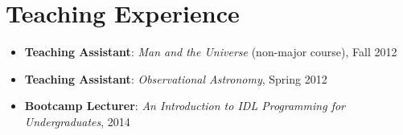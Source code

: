 \documentclass[11pt,letterpaper,roman]{moderncv}        %
\begin{document}
\begin{itemize}
\end{itemize}

\section{Teaching Experience}
\begin{itemize}
\setlength\itemsep{0.0em}
\item {\bfseries Teaching Assistant}: \textit{Man and the Universe} (non-major course), Fall 2012 %
\item {\bfseries Teaching Assistant}: \textit{Observational Astronomy}, Spring 2012 %
\item {\bfseries Bootcamp Lecturer}: \textit{An Introduction to IDL Programming for Undergraduates}, 2014 %
\end{itemize}

\end{document}
